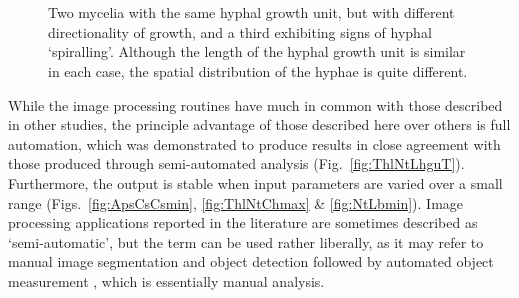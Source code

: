 \begin{figure}[tb]
	\centering
	\\
	\\
	\caption{Two mycelia with the same hyphal growth unit, but with different directionality of growth, and a third exhibiting signs of hyphal \lq spiralling'. Although the length of the hyphal growth unit is similar in each case, the spatial distribution of the hyphae is quite different.}
	\label{fig:GrowthPatterns}
\end{figure}


While the image processing routines have much in common with those described in other studies, the principle advantage of those described here over others is full automation, which was demonstrated to produce results in close agreement with those produced through semi-automated analysis (Fig.~\ref{fig:ThlNtLhguT}). Furthermore, the output is stable when input parameters are varied over a small range (Figs.~\ref{fig:ApsCsCsmin}, \ref{fig:ThlNtChmax} \& \ref{fig:NtLbmin}). Image processing applications reported in the literature are sometimes described as \lq semi-automatic', but the term can be used rather liberally, as it may refer to manual image segmentation and object detection followed by automated object measurement \cite{papagianni1999}, which is essentially manual analysis.

